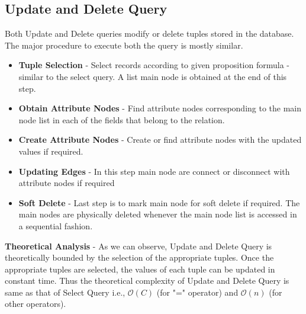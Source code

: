 \documentclass[12pt, oneside]{book}
\begin{document}
\subsection{Update and Delete Query}
Both Update and Delete queries modify or delete tuples stored in the database. The major procedure to execute both the query is mostly similar.
\begin{itemize}
  \item \textbf{Tuple Selection} - Select records according to given proposition formula - similar to the select query. A list main node is obtained at the end of this step.
  \item \textbf{Obtain Attribute Nodes} - Find attribute nodes corresponding to the main node list in each of the fields that belong to the relation.
  \item \textbf{Create Attribute Nodes} - Create or find attribute nodes with the updated values if required.
  \item \textbf{Updating Edges} - In this step main node are connect or disconnect with attribute nodes if required
  \item \textbf{Soft Delete} - Last step is to mark main node for soft delete if required. The main nodes are physically deleted whenever the main node list is accessed in a sequential fashion.
 \end{itemize}
 \par \textbf{Theoretical Analysis} - As we can observe, Update and Delete Query is theoretically bounded by the selection of the appropriate tuples. Once the appropriate tuples are selected, the values of each tuple can be updated in constant time. Thus the theoretical complexity of Update and Delete Query is same as that of Select Query i.e., $\mathcal{O}(C)$ (for "=" operator) and $\mathcal{O}(n)$ (for other operators).
\end{document}
